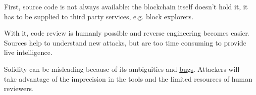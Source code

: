 First, source code is not always available: the blockchain itself doesn't hold it, it has to be supplied to third party services, e.g. block explorers.

With it, code review is humanly possible and reverse engineering becomes easier.
Sources help to understand new attacks, but are too time consuming to provide live intelligence.

Solidity can be misleading because of its ambiguities and \href{\urldocssoliditybugs}{bugs}.
Attackers will take advantage of the imprecision in the tools and the limited resources of human reviewers.
